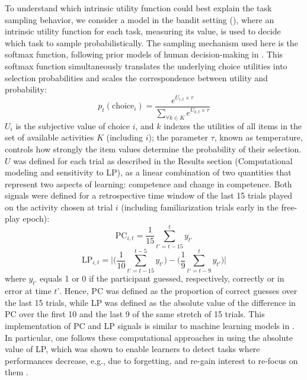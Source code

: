 To understand which intrinsic utility function could best explain the task sampling behavior, we consider a model in the bandit setting (\parencite{linke_adapting_2020}), where an intrinsic utility function for each task, measuring its value, is used to decide which task to sample probabilistically. The sampling mechanism used here is the softmax function, following prior models of human decision-making in \parencite{nussenbaum_reinforcement_2019}. This softmax function simultaneously translates the underlying choice utilities into selection probabilities and scales the correspondence between utility and probability: 
\begin{equation}\label{eq:softmax}
    p_t(\text{choice}_i) = \frac{e^{U_{i,t}\times\tau}}{\sum_{\forall k \in K}e^{U_{k,t}\times\tau}}
\end{equation}
$U_i$ is the subjective value of choice $i$, and $k$ indexes the utilities of all items in the set of available activities $K$ (including $i$); the parameter $\tau$, known as temperature, controls how strongly the item values determine the probability of their selection. $U$ was defined for each trial as described in the Results section (Computational modeling and sensitivity to LP), as a linear combination of two quantities that represent two aspects of learning: competence and change in competence. Both signals were defined for a retrospective time window of the last 15 trials played on the activity chosen at trial $i$  (including familiarization trials early in the free-play epoch): 
\begin{equation}\label{eq:pc}
    \text{PC}_{i,t} = \frac{1}{15}\sum_{t'=t-15}^{t} y_{t'}
\end{equation}
\begin{equation}\label{eq:lp}
    \text{LP}_{i,t} = \bigg|\Big(\frac{1}{10}\sum_{t'=t-15}^{t-5} y_{t'}\Big) - \Big(\frac{1}{9}\sum_{t'=t-9}^{t} y_{t'}\Big)\bigg|
\end{equation}
where $y_{t’}$ equals 1 or 0 if the participant guessed, respectively, correctly or in error at time $t’$. Hence, \ac{PC} was defined as the proportion of correct guesses over the last 15 trials, while \ac{LP} was defined as the absolute value of the difference in \ac{PC} over the first 10 and the last 9 of the same stretch of 15 trials. This implementation of  \ac{PC} and \ac{LP} signals is similar to machine learning models in \parencite{oudeyer_intrinsic_2007,colas_curious_2019,linke_adapting_2020}. In particular, one follows these computational approaches in using the absolute value of \ac{LP}, which was shown to enable learners to detect tasks where performances decrease, e.g., due to forgetting, and re-gain interest to re-focus on them \parencite{colas_curious_2019}.
 
